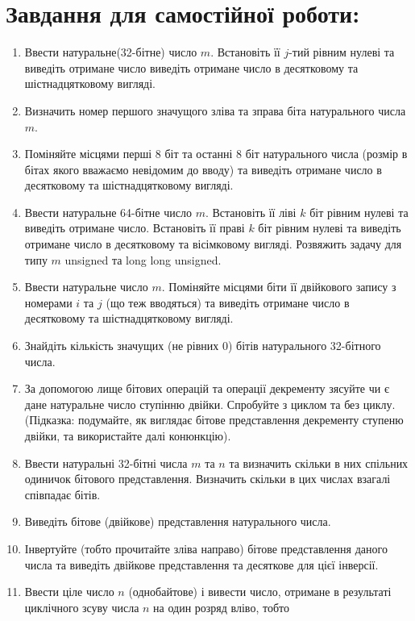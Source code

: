 \documentclass[a5paper,titlepage,openany,twoside,draft]{book_unv}%
\begin{document}
\section{Завдання для самостійної роботи:}

\begin{enumerate}
\def\labelenumi{\arabic{enumi})}
\setcounter{enumi}{8}
\item
  Ввести натуральне(32-бітне) число $m$. Встановіть її $j$-тий рівним нулеві
  та виведіть отримане число виведіть отримане число в десятковому та
  шістнадцятковому вигляді.
\item
  Визначить номер першого значущого зліва та зправа біта натурального
  числа $m$.
\item
  Поміняйте місцями перші 8 біт та останні 8 біт натурального числа
  (розмір в бітах якого вважаємо невідомим до вводу) та виведіть
  отримане число в десятковому та шістнадцятковому вигляді.
\item
  Ввести натуральне 64-бітне число $m$. Встановіть її ліві $k$ біт рівним
  нулеві та виведіть отримане число. Встановіть її праві $k$ біт рівним
  нулеві та виведіть отримане число в десятковому та вісімковому
  вигляді. Розвяжить задачу для типу $m$ unsigned та long long unsigned.
\item
  Ввести натуральне число $m$. Поміняйте місцями біти її двійкового запису
  з номерами $i$ та $j$ (що теж вводяться) та виведіть отримане число в
  десятковому та шістнадцятковому вигляді.
\item
  Знайдіть кількість значущих (не рівних 0) бітів натурального
  32-бітного числа.
\item
  За допомогою лище бітових операцій та операції декременту зясуйте чи є
  дане натуральне число ступінню двійки. Спробуйте з циклом та без
  циклу. (Підказка: подумайте, як виглядає бітове представлення
  декременту ступеню двійки, та використайте далі конюнкцію).
\item
  Ввести натуральні 32-бітні числа $m$ та $n$ та визначить скільки в них
  спільних одиничок бітового представлення. Визначить скільки в цих
  числах взагалі співпадає бітів.
\item
  Виведіть бітове (двійкове) представлення натурального числа.
\item
  Інвертуйте (тобто прочитайте зліва направо) бітове представлення
  даного числа та виведіть двійкове представлення та десяткове для цієї
  інверсії.
\item
  Ввести ціле число $n$ (однобайтове) і вивести число, отримане в
  результаті циклічного зсуву числа $n$ на один розряд вліво, тобто

\end{enumerate}
\end{document}
